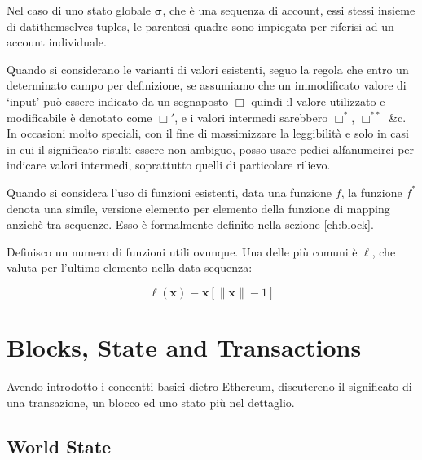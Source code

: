\documentclass[9pt,oneside]{amsart}
\begin{document}
\begin{multicols}{2}
Nel caso di uno stato globale $\boldsymbol{\sigma}$, che è una sequenza di account, essi stessi insieme di datithemselves tuples, le parentesi quadre sono impiegata per riferisi ad un account individuale.

Quando si considerano le varianti di valori esistenti, seguo la regola che entro un determinato campo per definizione, se assumiamo che un immodificato valore di `input' può essere indicato da un segnaposto $\Box$ quindi il valore utilizzato e modificabile è denotato come $\Box'$, e i valori intermedi sarebbero $\Box^*$,  $\Box^{**}$ \&c. In occasioni molto speciali, con il fine di massimizzare la leggibilità e solo in casi in cui il significato risulti essere non ambiguo, posso usare pedici alfanumeirci per indicare valori intermedi, soprattutto quelli di particolare rilievo.

Quando si considera l'uso di funzioni esistenti, data una funzione $f$, la funzione $f^*$ denota una simile, versione elemento per elemento della funzione di mapping anzichè tra sequenze. Esso è formalmente definito nella sezione \ref{ch:block}.

Definisco un numero di funzioni utili ovunque. Una delle più comuni è $\ell$, che valuta per l'ultimo elemento nella data sequenza:

\begin{equation}
\ell(\mathbf{x}) \equiv \mathbf{x}[\lVert \mathbf{x} \rVert - 1]
\end{equation}

\section{Blocks, State and Transactions} \label{ch:bst}

Avendo introdotto i concentti basici dietro Ethereum, discutereno il significato di una transazione, un blocco ed uno stato più nel dettaglio.

\subsection{World State} \label{ch:state}


\end{multicols}
\end{document}
